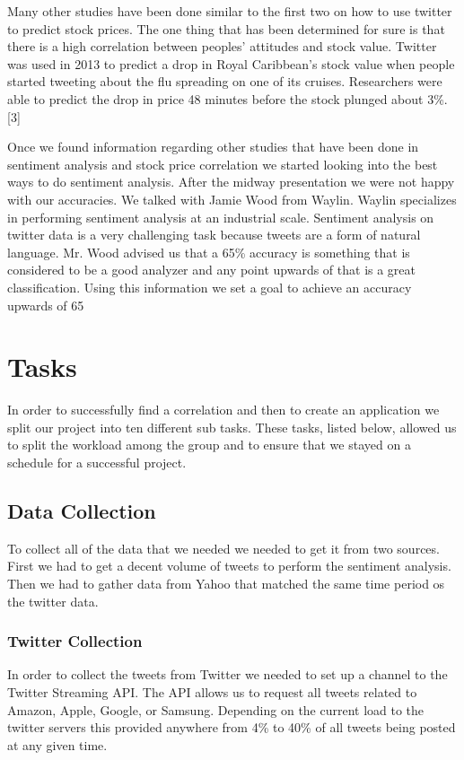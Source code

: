 \documentclass{acm_proc_article-sp}
\begin{document}
Many other studies have been done similar to the first two on how to use
twitter to predict stock prices. The one thing that has been determined for
sure is that there is a high correlation between peoples' attitudes and stock
value. Twitter was used in 2013 to predict a drop in Royal Caribbean's stock
value when people started tweeting about the flu spreading on one of its
cruises. Researchers were able to predict the drop in price 48 minutes before
the stock plunged about 3\%.[3]

Once we found information regarding other studies that have been done in
sentiment analysis and stock price correlation we started looking into the best
ways to do sentiment analysis. After the midway presentation we were not happy
with our accuracies. We talked with Jamie Wood from Waylin. Waylin specializes
in performing sentiment analysis at an industrial scale. Sentiment analysis on
twitter data is a very challenging task because tweets are a form of natural
language. Mr. Wood advised us that a 65\% accuracy is something that is
considered to be a good analyzer and any point upwards of that is a great
classification. Using this information we set a goal to achieve an accuracy
upwards of 65%

\section{Tasks}

In order to successfully find a correlation and then to create an application
we split our project into ten different sub tasks. These tasks, listed below,
allowed us to split the workload among the group and to ensure that we stayed
on a schedule for a successful project.

\subsection{Data Collection} 

To collect all of the data that we needed we needed to get it from two sources.
First we had to get a decent volume of tweets to perform the sentiment
analysis. Then we had to gather data from Yahoo that matched the same time
period os the twitter data.

\subsubsection{Twitter Collection} 

In order to collect the tweets from Twitter we needed to set up a channel to
the Twitter Streaming API. The API allows us to request all tweets related to
Amazon, Apple, Google, or Samsung. Depending on the current load to the twitter
servers this provided anywhere from 4\% to 40\% of all tweets being posted at
any given time. 
\end{document}
